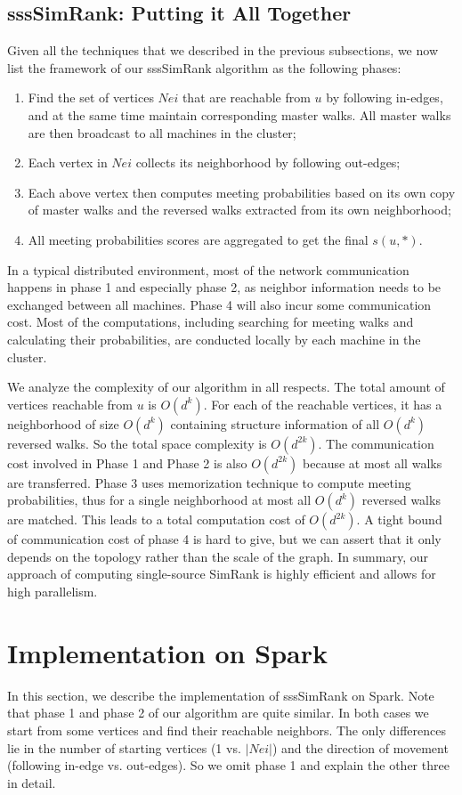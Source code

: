 \documentclass[conference]{IEEEtran}
\theoremstyle{definition}
\theoremstyle{definition}
\begin{document}
\subsection{sssSimRank: Putting it All Together}
Given  all the techniques that we described in the previous subsections, we now list the framework of our sssSimRank algorithm as the following phases:
\begin{enumerate}
\item Find the set of vertices $Nei$ that are reachable from  $u$ by following in-edges, and at the same time maintain corresponding master walks. All master walks are then broadcast to all machines in the cluster;
\item Each vertex in $Nei$ collects its neighborhood by following out-edges;
\item Each above vertex then computes meeting probabilities based on its own copy of master walks and  the reversed walks extracted from its own neighborhood; 
\item All meeting probabilities scores are aggregated to get the final $s(u, *)$.
\end{enumerate}

In a typical distributed environment, most of the network communication happens in phase 1 and especially phase 2, as neighbor information needs to be exchanged between all machines.
Phase 4 will also incur some communication cost.
Most of the computations, including searching for  meeting walks and calculating their  probabilities, are 
conducted locally by each machine in the cluster.

We analyze the complexity  of our algorithm in all respects. 
The total amount of vertices reachable from $u$ is $O(d^{k})$.
For each of the reachable vertices, it has a neighborhood of size $O(d^{k})$ containing structure information of all  $O(d^k)$ reversed walks.
So the total space complexity is  $O(d^{2k})$.
The communication cost involved in Phase 1 and Phase 2 is also $O(d^{2k})$ because at most all walks are transferred.
Phase 3 uses memorization technique to compute meeting probabilities, thus for a single neighborhood at most all $O(d^k)$ reversed walks are matched. 
This leads to a total computation cost of $O(d^{2k})$.
A tight bound of communication cost of phase 4 is hard to give, but we can assert that it only depends on the topology rather than the scale of the graph. In summary, our approach of  computing single-source SimRank is highly efficient and  allows for high parallelism.
 
\section{Implementation on Spark}
In this section, we describe the implementation of sssSimRank  on Spark. 
Note that  phase 1 and phase 2  of our algorithm are quite similar.
In both cases we start from some vertices and find their reachable neighbors.  
The only differences lie  in the number of starting vertices (1 vs. $|Nei|$) and the direction of movement (following in-edge vs. out-edges). 
So we omit phase 1 and explain the other three in detail.
\end{document}
